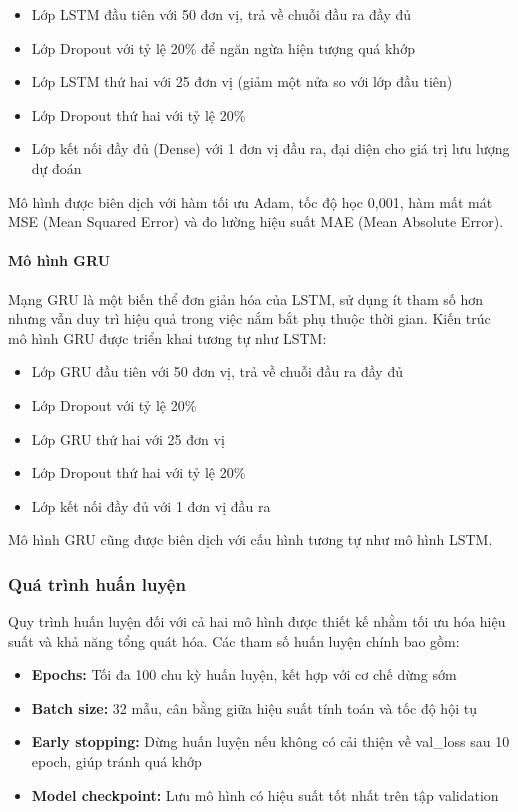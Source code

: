 \begin{itemize}
    \item Lớp LSTM đầu tiên với 50 đơn vị, trả về chuỗi đầu ra đầy đủ
    \item Lớp Dropout với tỷ lệ 20\% để ngăn ngừa hiện tượng quá khớp
    \item Lớp LSTM thứ hai với 25 đơn vị (giảm một nửa so với lớp đầu tiên)
    \item Lớp Dropout thứ hai với tỷ lệ 20\%
    \item Lớp kết nối đầy đủ (Dense) với 1 đơn vị đầu ra, đại diện cho giá trị lưu lượng dự đoán
\end{itemize}

Mô hình được biên dịch với hàm tối ưu Adam, tốc độ học 0,001, hàm mất mát MSE (Mean Squared Error) và đo lường hiệu suất MAE (Mean Absolute Error).

\paragraph{Mô hình GRU}
Mạng GRU là một biến thể đơn giản hóa của LSTM, sử dụng ít tham số hơn nhưng vẫn duy trì hiệu quả trong việc nắm bắt phụ thuộc thời gian. Kiến trúc mô hình GRU được triển khai tương tự như LSTM:

\begin{itemize}
    \item Lớp GRU đầu tiên với 50 đơn vị, trả về chuỗi đầu ra đầy đủ
    \item Lớp Dropout với tỷ lệ 20\%
    \item Lớp GRU thứ hai với 25 đơn vị
    \item Lớp Dropout thứ hai với tỷ lệ 20\%
    \item Lớp kết nối đầy đủ với 1 đơn vị đầu ra
\end{itemize}

Mô hình GRU cũng được biên dịch với cấu hình tương tự như mô hình LSTM.

\subsubsection{Quá trình huấn luyện}

Quy trình huấn luyện đối với cả hai mô hình được thiết kế nhằm tối ưu hóa hiệu suất và khả năng tổng quát hóa. Các tham số huấn luyện chính bao gồm:

\begin{itemize}
    \item \textbf{Epochs:} Tối đa 100 chu kỳ huấn luyện, kết hợp với cơ chế dừng sớm
    \item \textbf{Batch size:} 32 mẫu, cân bằng giữa hiệu suất tính toán và tốc độ hội tụ
    \item \textbf{Early stopping:} Dừng huấn luyện nếu không có cải thiện về val\_loss sau 10 epoch, giúp tránh quá khớp
    \item \textbf{Model checkpoint:} Lưu mô hình có hiệu suất tốt nhất trên tập validation
\end{itemize}

